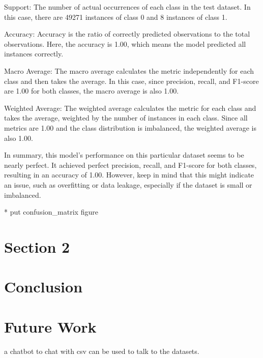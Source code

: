 Support: The number of actual occurrences of each class in the test dataset. In this case, there are 49271 instances of class 0 and 8 instances of class 1.

Accuracy: Accuracy is the ratio of correctly predicted observations to the total observations. Here, the accuracy is 1.00, which means the model predicted all instances correctly.

Macro Average: The macro average calculates the metric independently for each class and then takes the average. In this case, since precision, recall, and F1-score are 1.00 for both classes, the macro average is also 1.00.

Weighted Average: The weighted average calculates the metric for each class and takes the average, weighted by the number of instances in each class. Since all metrics are 1.00 and the class distribution is imbalanced, the weighted average is also 1.00.

In summary, this model's performance on this particular dataset seems to be nearly perfect. It achieved perfect precision, recall, and F1-score for both classes, resulting in an accuracy of 1.00. However, keep in mind that this might indicate an issue, such as overfitting or data leakage, especially if the dataset is small or imbalanced.

* put confusion\_matrix figure




\section{Section 2}
\label{sec:results:sec3}



\section{Conclusion}
\label{sec:results:conclusion}




\section{Future Work}
\label{sec:results:future}

a chatbot to chat with csv can be used to talk to the datasets.